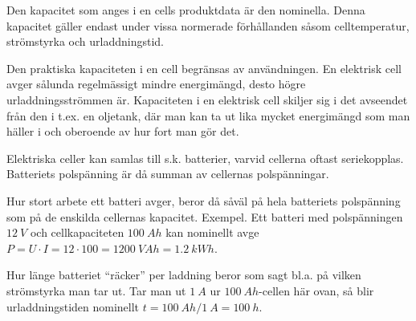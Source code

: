 Den kapacitet som anges i en cells produktdata är den nominella. Denna kapacitet
gäller endast under vissa normerade förhållanden såsom celltemperatur,
strömstyrka och urladdningstid.

Den praktiska kapaciteten i en cell begränsas av användningen. En elektrisk cell
avger sålunda regelmässigt mindre energimängd, desto högre urladdningsströmmen
är. Kapaciteten i en elektrisk cell skiljer sig i det avseendet från den i
t.ex. en oljetank, där man kan ta ut lika mycket energimängd som man häller i
och oberoende av hur fort man gör det.

Elektriska celler kan samlas till s.k. batterier, varvid cellerna oftast
seriekopplas.
Batteriets polspänning är då summan av cellernas polspänningar.

Hur stort arbete ett batteri avger, beror då såväl på hela batteriets
polspänning som på de enskilda cellernas kapacitet.
Exempel.
Ett batteri med polspänningen \(12\ V\) och cellkapaciteten \(100\ Ah\) kan
nominellt avge
\(P = U \cdot I = 12 \cdot 100 = 1200\ VAh = 1.2\ kWh\).

Hur länge batteriet ``räcker'' per laddning beror som sagt bl.a. på vilken
strömstyrka man tar ut. Tar man ut \(1\ A\) ur \(100\ Ah\)-cellen här ovan, så
blir urladdningstiden nominellt \(t = 100\ Ah/1\ A = 100\ h\).

